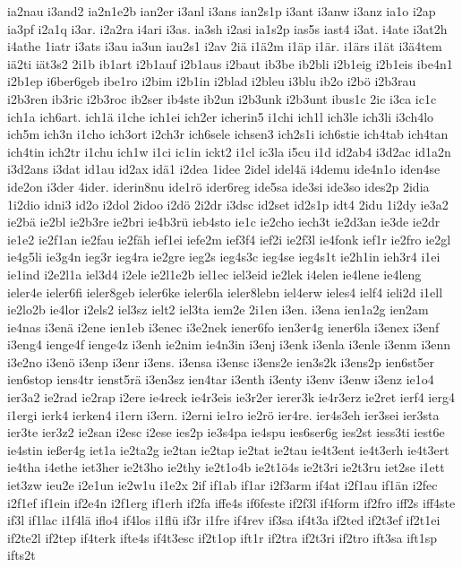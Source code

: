 {ia2nau
i3and2
ia2n1e2b
ian2er
i3anl
i3ans
ian2s1p
i3ant
i3anw
i3anz
ia1o
i2ap
ia3pf
i2a1q
i3ar.
i2a2ra
i4ari
i3as.
ia3sh
i2asi
ia1s2p
ias5s
iast4
i3at.
i4ate
i3at2h
i4athe
1iatr
i3ats
i3au
ia3un
iau2s1
i2av
2iä
i1ä2m
i1äp
i1är.
i1ärs
i1ät
i3ä4tem
iä2ti
iät3s2
2i1b
ib1art
i2b1auf
i2b1aus
i2baut
ib3be
ib2bli
i2b1eig
i2b1eis
ibe4n1
i2b1ep
i6ber6geb
ibe1ro
i2bim
i2b1in
i2blad
i2bleu
i3blu
ib2o
i2bö
i2b3rau
i2b3ren
ib3ric
i2b3roc
ib2ser
ib4ste
ib2un
i2b3unk
i2b3unt
ibus1c
2ic
i3ca
ic1c
ich1a
ich6art.
ich1ä
i1che
ich1ei
ich2er
icherin5
i1chi
ich1l
ich3le
ich3li
i3ch4lo
ich5m
ich3n
i1cho
ich3ort
i2ch3r
ich6sele
ichsen3
ich2s1i
ich6stie
ich4tab
ich4tan
ich4tin
ich2tr
i1chu
ich1w
i1ci
ic1in
ickt2
i1cl
ic3la
i5cu
i1d
id2ab4
i3d2ac
id1a2n
i3d2ans
i3dat
id1au
id2ax
idä1
i2dea
1idee
2idel
idel4ä
i4demu
ide4n1o
iden4se
ide2on
i3der
4ider.
iderin8nu
ide1rö
ider6reg
ide5sa
ide3si
ide3so
ides2p
2idia
1i2dio
idni3
id2o
i2dol
2idoo
i2dö
2i2dr
i3dsc
id2set
id2s1p
idt4
2idu
1i2dy
ie3a2
ie2bä
ie2bl
ie2b3re
ie2bri
ie4b3rü
ieb4sto
ie1c
ie2cho
iech3t
ie2d3an
ie3de
ie2dr
ie1e2
ie2f1an
ie2fau
ie2fäh
ief1ei
iefe2m
ief3f4
ief2i
ie2f3l
ie4fonk
ief1r
ie2fro
ie2gl
ie4g5li
ie3g4n
ieg3r
ieg4ra
ie2gre
ieg2s
ieg4s3c
ieg4se
ieg4s1t
ie2h1in
ieh3r4
i1ei
ie1ind
i2e2l1a
iel3d4
i2ele
ie2l1e2b
iel1ec
iel3eid
ie2lek
i4elen
ie4lene
ie4leng
ieler4e
ieler6fi
ieler8geb
ieler6ke
ieler6la
ieler8lebn
iel4erw
ieles4
ielf4
ieli2d
i1ell
ie2lo2b
ie4lor
i2els2
iel3sz
ielt2
iel3ta
iem2e
2i1en
i3en.
i3ena
ien1a2g
ien2am
ie4nas
i3enä
i2ene
ien1eb
i3enec
i3e2nek
iener6fo
ien3er4g
iener6la
i3enex
i3enf
i3eng4
ienge4f
ienge4z
i3enh
ie2nim
ie4n3in
i3enj
i3enk
i3enla
i3enle
i3enm
i3enn
i3e2no
i3enö
i3enp
i3enr
i3ens.
i3ensa
i3ensc
i3ens2e
ien3s2k
i3ens2p
ien6st5er
ien6stop
iens4tr
ienst5rä
i3en3sz
ien4tar
i3enth
i3enty
i3env
i3enw
i3enz
ie1o4
ier3a2
ie2rad
ie2rap
i2ere
ie4reck
ie4r3eis
ie3r2er
ierer3k
ie4r3erz
ie2ret
ierf4
ierg4
i1ergi
ierk4
ierken4
i1ern
i3ern.
i2erni
ie1ro
ie2rö
ier4re.
ier4s3eh
ier3sei
ier3sta
ier3te
ier3z2
ie2san
i2esc
i2ese
ies2p
ie3s4pa
ie4spu
ies6ser6g
ies2st
iess3ti
iest6e
ie4stin
ießer4g
iet1a
ie2ta2g
ie2tan
ie2tap
ie2tat
ie2tau
ie4t3ent
ie4t3erh
ie4t3ert
ie4tha
i4ethe
iet3her
ie2t3ho
ie2thy
ie2t1o4b
ie2t1ö4s
ie2t3ri
ie2t3ru
iet2se
i1ett
iet3zw
ieu2e
i2e1un
ie2w1u
i1e2x
2if
if1ab
if1ar
i2f3arm
if4at
i2f1au
if1än
i2fec
i2f1ef
if1ein
if2e4n
i2f1erg
if1erh
if2fa
iffe4s
if6feste
if2f3l
if4form
if2fro
iff2s
iff4ste
if3l
if1lac
i1f4lä
iflo4
if4los
i1flü
if3r
i1fre
if4rev
if3sa
if4t3a
if2ted
if2t3ef
if2t1ei
if2te2l
if2tep
if4terk
ifte4s
if4t3esc
if2t1op
ift1r
if2tra
if2t3ri
if2tro
ift3sa
ift1sp
ifts2t
}
